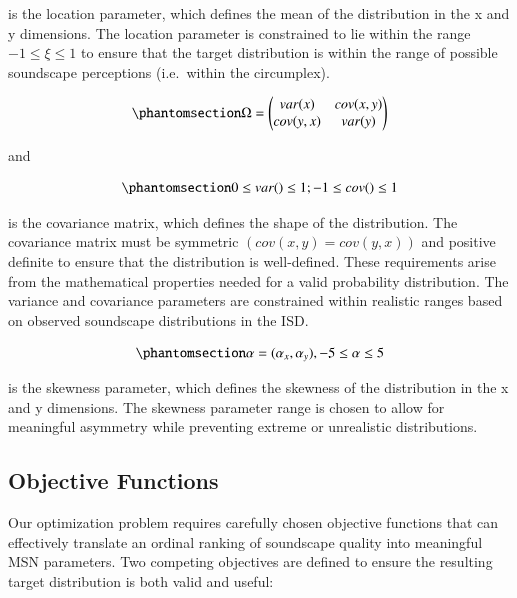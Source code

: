 \documentclass[
  authoryear,
  preprint,
  3p]{elsarticle}
\begin{document}
is the location parameter, which defines the mean of the distribution in
the x and y dimensions. The location parameter is constrained to lie
within the range \(-1 \leq \xi \leq 1\) to ensure that the target
distribution is within the range of possible soundscape perceptions
(i.e.~within the circumplex).

\begin{equation}\phantomsection\label{eq-target-omega}{
\Omega = \begin{pmatrix} var(x) & cov(x, y) \\ cov(y, x) & var(y) \end{pmatrix}
}\end{equation}

and

\begin{equation}\phantomsection\label{eq-target-omega-constraints}{
0 \leq var() \leq 1; -1 \leq cov() \leq 1
}\end{equation}

is the covariance matrix, which defines the shape of the distribution.
The covariance matrix must be symmetric \((cov(x,y) = cov(y,x))\) and
positive definite to ensure that the distribution is well-defined. These
requirements arise from the mathematical properties needed for a valid
probability distribution. The variance and covariance parameters are
constrained within realistic ranges based on observed soundscape
distributions in the ISD.

\begin{equation}\phantomsection\label{eq-target-alpha}{
\alpha = (\alpha_x, \alpha_y), -5 \leq \alpha \leq 5
}\end{equation}

is the skewness parameter, which defines the skewness of the
distribution in the x and y dimensions. The skewness parameter range is
chosen to allow for meaningful asymmetry while preventing extreme or
unrealistic distributions.

\subsection{Objective Functions}\label{objective-functions}

Our optimization problem requires carefully chosen objective functions
that can effectively translate an ordinal ranking of soundscape quality
into meaningful MSN parameters. Two competing objectives are defined to
ensure the resulting target distribution is both valid and useful:
\end{document}
